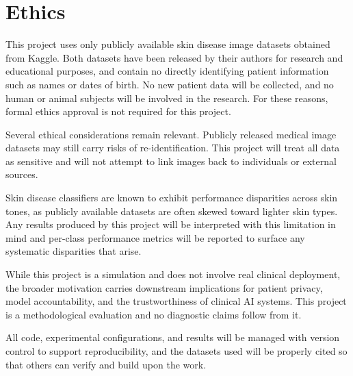 \documentclass[12pt,openany,a4paper]{book}
\begin{document}
\section{Ethics}
This project uses only publicly available skin disease image datasets obtained from Kaggle. Both datasets have been released by their authors for research and educational purposes, and contain no directly identifying patient information such as names or dates of birth. No new patient data will be collected, and no human or animal subjects will be involved in the research. For these reasons, formal ethics approval is not required for this project.

Several ethical considerations remain relevant. Publicly released medical image datasets may still carry risks of re-identification. This project will treat all data as sensitive and will not attempt to link images back to individuals or external sources.

Skin disease classifiers are known to exhibit performance disparities across skin tones, as publicly available datasets are often skewed toward lighter skin types. Any results produced by this project will be interpreted with this limitation in mind and per-class performance metrics will be reported to surface any systematic disparities that arise.

While this project is a simulation and does not involve real clinical deployment, the broader motivation carries downstream implications for patient privacy, model accountability, and the trustworthiness of clinical AI systems. This project is a methodological evaluation and no diagnostic claims follow from it.

All code, experimental configurations, and results will be managed with version control to support reproducibility, and the datasets used will be properly cited so that others can verify and build upon the work.
\clearpage


\end{document}
